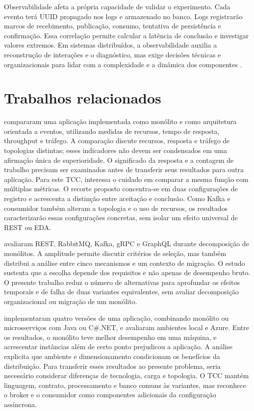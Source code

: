Observabilidade afeta a própria capacidade de validar o experimento. Cada evento terá UUID propagado nos logs e armazenado no banco. Logs registrarão marcos de recebimento, publicação, consumo, tentativa de persistência e confirmação. Essa correlação permite calcular a latência de conclusão e investigar valores extremos. Em sistemas distribuídos, a observabilidade auxilia a reconstrução de interações e o diagnóstico, mas exige decisões técnicas e organizacionais para lidar com a complexidade e a dinâmica dos componentes \cite{niedermaier2019}.

\section{Trabalhos relacionados}

 compararam uma aplicação implementada como monólito e como arquitetura orientada a eventos, utilizando medidas de recursos, tempo de resposta, throughput e tráfego. A comparação discute recursos, resposta e tráfego de topologias distintas; esses indicadores não devem ser condensados em uma afirmação única de superioridade. O significado da resposta e a contagem de trabalho precisam ser examinados antes de transferir seus resultados para outra aplicação. Para este TCC, interessa o cuidado em comparar a mesma função com múltiplas métricas. O recorte proposto concentra-se em duas configurações de registro e acrescenta a distinção entre aceitação e conclusão. Como Kafka e consumidor também alteram a topologia e o uso de recursos, os resultados caracterizarão essas configurações concretas, sem isolar um efeito universal de REST ou EDA.

 avaliaram REST, RabbitMQ, Kafka, gRPC e GraphQL durante decomposição de monólitos. A amplitude permite discutir critérios de seleção, mas também distribui a análise entre cinco mecanismos e um contexto de migração. O estudo sustenta que a escolha depende dos requisitos e não apenas de desempenho bruto. O presente trabalho reduz o número de alternativas para aprofundar os efeitos temporais e de falha de duas variantes equivalentes, sem avaliar decomposição organizacional ou migração de um monólito.

 implementaram quatro versões de uma aplicação, combinando monólito ou microsserviços com Java ou C\#.NET, e avaliaram ambientes local e Azure. Entre os resultados, o monólito teve melhor desempenho em uma máquina, e acrescentar instâncias além de certo ponto prejudicou a aplicação. A análise explicita que ambiente e dimensionamento condicionam os benefícios da distribuição. Para transferir esses resultados ao presente problema, seria necessário considerar diferenças de tecnologia, carga e topologia. O TCC mantém linguagem, contrato, processamento e banco comuns às variantes, mas reconhece o broker e o consumidor como componentes adicionais da configuração assíncrona.

